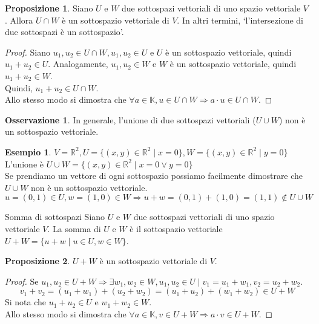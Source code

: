 \documentclass[a4paper]{article}
\theoremstyle{definition}
\newtheorem*{oss}{Osservazione}
\newtheorem*{es}{Esempio}
\newtheorem*{prop}{Proposizione}
\begin{document}
\begin{prop}
	Siano $U$ e $W$ due sottospazi vettoriali di uno spazio vettoriale $V$. Allora $U \cap W$ è un sottospazio vettoriale di $V$.
	In altri termini, \enquote*{l'intersezione di due sottospazi è un sottospazio}.
\end{prop}

\begin{proof}
	Siano $u_1, u_2 \in U \cap W, u_1, u_2 \in U$ e $U$ è un sottospazio vettoriale, quindi $u_1 + u_2 \in U$.
	Analogamente, $u_1, u_2 \in W$ e $W$ è un sottospazio vettoriale, quindi $u_1 + u_2 \in W$. \\
	Quindi, $u_1 + u_2 \in U \cap W$. \\
	Allo stesso modo si dimostra che $\forall a \in \mathbb{K}, u \in U \cap W \Rightarrow a \cdot u \in U \cap W$.
\end{proof}

\begin{oss}
	In generale, l'unione di due sottospazi vettoriali ($U \cup W$) non è un sottospazio vettoriale.
\end{oss}
\begin{es}
	$V = \mathbb{R}^2, U = \{(x, y) \in \mathbb{R}^2 \mid x = 0\}, W = \{(x, y) \in \mathbb{R}^2 \mid y = 0\}$ \\
	L'unione è $U \cup W = \{(x, y) \in \mathbb{R}^2 \mid x = 0 \lor y = 0\}$ \\
	Se prendiamo un vettore di ogni sottospazio possiamo facilmente dimostrare che $U \cup W$ non è un sottospazio vettoriale.
	\[ u = (0, 1) \in U, w = (1, 0) \in W \Rightarrow u + w = (0, 1) + (1, 0) = (1, 1) \notin U \cup W \]
\end{es}

\begin{deff}{Somma di sottospazi}{}
	Siano $U$ e $W$ due sottospazi vettoriali di uno spazio vettoriale $V$.
	La somma di $U$ e $W$ è il sottospazio vettoriale $U + W = \{u + w \mid u \in U, w \in W\}$.
\end{deff}
\begin{prop}
	$U + W$ è un sottospazio vettoriale di $V$.
\end{prop}
\begin{proof}
	Se $u_1, u_2 \in U + W \Rightarrow \exists w_1, w_2 \in W, u_1, u_2 \in U \mid v_1 = u_1 + w_1, v_2 = u_2 + w_2$.
	\[ v_1 + v_2 = (u_1 + w_1) + (u_2 + w_2) = (u_1 + u_2) + (w_1 + w_2) \in U + W \]
	Si nota che $u_1 + u_2 \in U$ e $w_1 + w_2 \in W$. \\
	Allo stesso modo si dimostra che $\forall a \in \mathbb{K}, v \in U + W \Rightarrow a \cdot v \in U + W$.
\end{proof}
\end{document}
